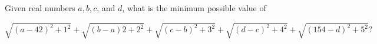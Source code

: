 Given real numbers $a, b, c$, and $d$, what is the minimum possible value of

\[\sqrt{(a - 42)^2 + 1^2} +\sqrt{(b - a)2 + 2^2} +\sqrt{(c - b)^2 + 3^2} +\sqrt{(d - c)^2 + 4^2} +\sqrt{(154 - d)^2 + 5^2}?\]
